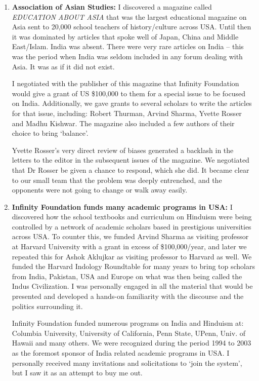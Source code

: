 \begin{enumerate}
\item \textbf{Association of Asian Studies:} I discovered a magazine called \textit{EDUCATION ABOUT ASIA} that was the largest educational magazine on Asia sent to 20,000 school teachers of history/culture across USA. Until then it was dominated by articles that spoke well of Japan, China and Middle East/Islam. India was absent. There were very rare articles on India – this was the period when India was seldom included in any forum dealing with Asia. It was as if it did not exist.

I negotiated with the publisher of this magazine that Infinity Foundation would give a grant of US \$100,000 to them for a special issue to be focused on India. Additionally, we gave grants to several scholars to write the articles for that issue, including: Robert Thurman, Arvind Sharma, Yvette Rosser and Madhu Kishwar. The magazine also included a few authors of their choice to bring ‘balance’.

Yvette Rosser’s very direct review of biases generated a backlash in the letters to the editor in the subsequent issues of the magazine. We negotiated that Dr Rosser be given a chance to respond, which she did. It became clear to our small team that the problem was deeply entrenched, and the opponents were not going to change or walk away easily.

\item \textbf{Infinity Foundation funds many academic programs in USA:} I discovered how the school textbooks and curriculum on Hinduism were being controlled by a network of academic scholars based in prestigious universities across USA. To counter this, we funded Arvind Sharma as visiting professor at Harvard University with a grant in excess of \$100,000/year, and later we repeated this for Ashok Aklujkar as visiting professor to Harvard as well. We funded the Harvard Indology Roundtable for many years to bring top scholars from India, Pakistan, USA and Europe on what was then being called the Indus Civilization. I was personally engaged in all the material that would be presented and developed a hands-on familiarity with the discourse and the politics surrounding it.

Infinity Foundation funded numerous programs on India and Hinduism at: Columbia University, University of California, Penn State, UPenn, Univ. of Hawaii and many others. We were recognized during the period 1994 to 2003 as the foremost sponsor of India related academic programs in USA. I personally received many invitations and solicitations to ‘join the system’, but I saw it as an attempt to buy me out.


\end{enumerate}
